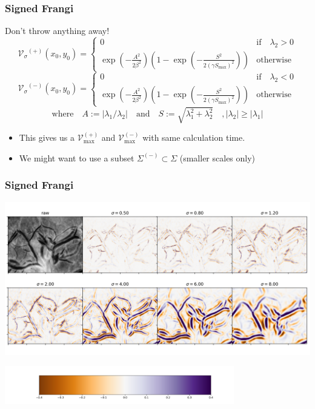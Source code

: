 \documentclass[9pt]{beamer}
\newcommand{\Vsigma}{\ensuremath{\mathcal{V}_{\sigma}}\xspace}
\newcommand{\Sigmaneg}{\Sigma^{(-)}}
\newcommand{\Vmaxpos}{\ensuremath{\mathcal{V}^{(+)}_{\max}}\xspace}
\newcommand{\Vmaxneg}{\ensuremath{\mathcal{V}^{(-)}_{\max}}\xspace}
\begin{document}
\begin{frame}
\frametitle{Signed Frangi}
Don't throw anything away!
  \begin{equation*}
\Vsigma^{(+)}(x_0,y_0) =
\begin{cases}
0 & \text{if} \quad \lambda_2 > 0 \\
\exp\left(-\frac{A^2}{2\beta^2}\right)
\left(1 - \exp\left(-\frac{S^2}{2{(\gamma S_{\max})}^2}\right)\right) & \textrm{otherwise}
\end{cases}
\end{equation*}
  \begin{equation*}
\Vsigma^{(-)}(x_0,y_0) =
\begin{cases}
0 & \text{if} \quad \lambda_2 < 0 \\
\exp\left(-\frac{A^2}{2\beta^2}\right)
\left(1 - \exp\left(-\frac{S^2}{2{(\gamma S_{\max})}^2}\right)\right) & \textrm{otherwise}
\end{cases}
\end{equation*}
\begin{equation*}
\textrm{where} \quad A := \left|\lambda_1 / \lambda_2\right|
\quad \textrm{and} \quad 
S := \sqrt{\lambda_1^2 + \lambda_2^2}
\quad, \left|\lambda_2\right| \ge \left|\lambda_1\right|
\end{equation*}
\begin{itemize}
  \item This gives us a $\Vmaxpos$ and $\Vmaxneg$ with same calculation time.
  \item We might want to use a subset $\Sigmaneg \subset \Sigma$ (smaller scales only)
\end{itemize}
\end{frame}

\begin{frame}
\frametitle{Signed Frangi}
\includegraphics[width=\textwidth]{signsweep_stitch_BN5280796_inset_alt}
\begin{center}
\includegraphics[width=0.75\textwidth]{signsweep_colorbar_alt}
\end{center}
\end{frame}
\end{document}
